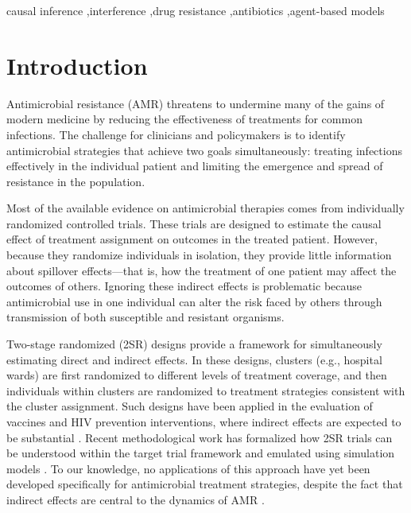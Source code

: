 \documentclass[preprint,11pt]{elsarticle}
\begin{document}
\begin{frontmatter}
\begin{abstract}
\textbf{Conclusion:} We found that antimicrobial prescribing policies interact with transmission dynamics in non-obvious ways through strain competition mechanisms. The two-stage randomized design is uniquely positioned to capture these indirect effects and spillover phenomena that conventional individually randomized trials cannot measure.

\end{abstract}

\begin{keyword}
causal inference \sep interference \sep drug resistance \sep antibiotics \sep agent-based models
\end{keyword}

\end{frontmatter}

\clearpage
\doublespacing

\section{Introduction}\label{sec:intro}

Antimicrobial resistance (AMR) threatens to undermine many of the gains of modern medicine by reducing the effectiveness of treatments for common infections. The challenge for clinicians and policymakers is to identify antimicrobial strategies that achieve two goals simultaneously: treating infections effectively in the individual patient and limiting the emergence and spread of resistance in the population.

Most of the available evidence on antimicrobial therapies comes from individually randomized controlled trials. These trials are designed to estimate the causal effect of treatment assignment on outcomes in the treated patient. However, because they randomize individuals in isolation, they provide little information about spillover effects---that is, how the treatment of one patient may affect the outcomes of others. Ignoring these indirect effects is problematic because antimicrobial use in one individual can alter the risk faced by others through transmission of both susceptible and resistant organisms.

Two-stage randomized (2SR) designs provide a framework for simultaneously estimating direct and indirect effects. In these designs, clusters (e.g., hospital wards) are first randomized to different levels of treatment coverage, and then individuals within clusters are randomized to treatment strategies consistent with the cluster assignment. Such designs have been applied in the evaluation of vaccines and HIV prevention interventions, where indirect effects are expected to be substantial \citep{buchanan_disseminated_2021}. Recent methodological work has formalized how 2SR trials can be understood within the target trial framework and emulated using simulation models \citep{murray_emulating_2021}. To our knowledge, no applications of this approach have yet been developed specifically for antimicrobial treatment strategies, despite the fact that indirect effects are central to the dynamics of AMR \citep{gago_how_2025}.
\end{document}
